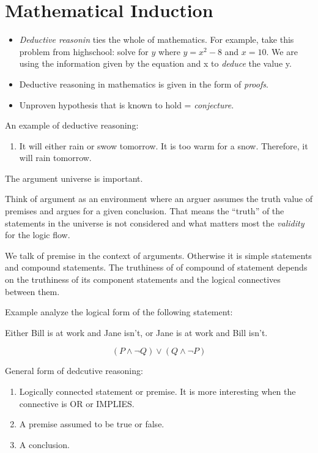 \documentclass[a4paper]{article}
\begin{document}
\section*{Mathematical Induction}

\begin{itemize}
    \item \emph{Deductive reasonin} ties the whole of mathematics. For example, take this problem from highschool: solve for \(y\) where
          \(y = x^2 - 8\) and \(x = 10\). We are using the information given by the equation and x to \emph{deduce} the value y. 
    \item Deductive reasoning in mathematics is given in the form of \emph{proofs}.
    \item Unproven hypothesis that is known to hold = \emph{conjecture}.
\end{itemize}

An example of deductive reasoning:

\begin{enumerate}
    \item It will either rain or swow tomorrow.
          It is too warm for a snow.
          Therefore, it will rain tomorrow.
\end{enumerate}

The argument universe is important.

Think of argument as an environment where an arguer assumes the truth value of premises and argues for a given conclusion. That means the ``truth'' of the statements in the universe
is not considered and what matters most the \emph{validity} for the logic flow.

We talk of premise in the context of arguments. Otherwise it is simple statements and compound statements. The truthiness of of compound of statement depends on 
the truthiness of its component statements and the logical connectives between them.

Example analyze the logical form of the following statement:

Either Bill is at work and Jane isn't, or Jane is at work and Bill isn't.

\[
    (P \land \lnot Q) \lor (Q \land \lnot P)
\]

General form of dedcutive reasoning:

\begin{enumerate}
    \item Logically connected statement or premise. It is more interesting when the connective is OR or IMPLIES.
    \item A premise assumed to be true or false.
    \item A conclusion.
\end{enumerate}
\end{document}
